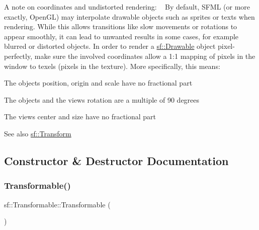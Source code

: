 A note on coordinates and undistorted rendering\+: ~\newline
By default, S\+F\+ML (or more exactly, Open\+GL) may interpolate drawable objects such as sprites or texts when rendering. While this allows transitions like slow movements or rotations to appear smoothly, it can lead to unwanted results in some cases, for example blurred or distorted objects. In order to render a \mbox{\hyperlink{classsf_1_1_drawable}{sf\+::\+Drawable}} object pixel-\/perfectly, make sure the involved coordinates allow a 1\+:1 mapping of pixels in the window to texels (pixels in the texture). More specifically, this means\+:
\begin{DoxyItemize}
\item The object\textquotesingle{}s position, origin and scale have no fractional part
\item The object\textquotesingle{}s and the view\textquotesingle{}s rotation are a multiple of 90 degrees
\item The view\textquotesingle{}s center and size have no fractional part
\end{DoxyItemize}

\begin{DoxySeeAlso}{See also}
\mbox{\hyperlink{classsf_1_1_transform}{sf\+::\+Transform}} \begin{DoxyVerb}\end{DoxyVerb}
 
\end{DoxySeeAlso}


\subsection{Constructor \& Destructor Documentation}
\mbox{\label{classsf_1_1_transformable_ae71710de0fef423121bab1c684954a2e}} 
\subsubsection{\texorpdfstring{Transformable()}{Transformable()}}
{\footnotesize\ttfamily sf\+::\+Transformable\+::\+Transformable (\begin{DoxyParamCaption}{ }\end{DoxyParamCaption})}



